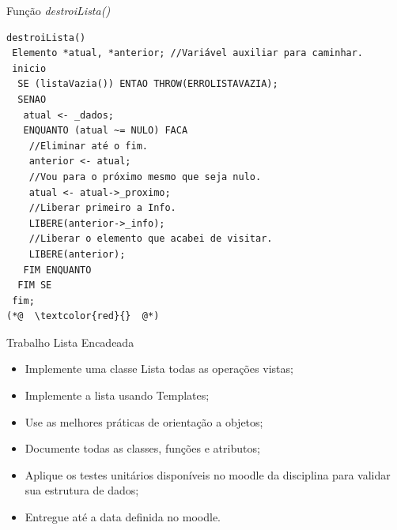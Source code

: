 \documentclass[12pt,table,xcolor={dvipsnames}]{beamer}
\begin{document}
\begin{frame}[fragile]{Função \textit{destroiLista()}}
\begin{lstlisting}
destroiLista()
 Elemento *atual, *anterior; //Variável auxiliar para caminhar.
 inicio
  SE (listaVazia()) ENTAO THROW(ERROLISTAVAZIA);
  SENAO
   atual <- _dados;    
   ENQUANTO (atual ~= NULO) FACA 
    //Eliminar até o fim.
    anterior <- atual;
    //Vou para o próximo mesmo que seja nulo.
    atual <- atual->_proximo;
    //Liberar primeiro a Info.
    LIBERE(anterior->_info);
    //Liberar o elemento que acabei de visitar.
    LIBERE(anterior);
   FIM ENQUANTO
  FIM SE
 fim;
(*@  \textcolor{red}{}  @*)
\end{lstlisting}
\end{frame}
























\begin{frame}[fragile]{Trabalho Lista Encadeada}
\begin{itemize}
\item Implemente uma classe Lista todas as operações vistas;
\item Implemente a lista usando Templates;
\item Use as melhores práticas de orientação a objetos;
\item Documente todas as classes, funções e atributos;
\item Aplique os testes unitários disponíveis no moodle da disciplina para validar sua estrutura de dados;
\item Entregue até a data definida no moodle.
\end{itemize}
\end{frame}
\end{document}
